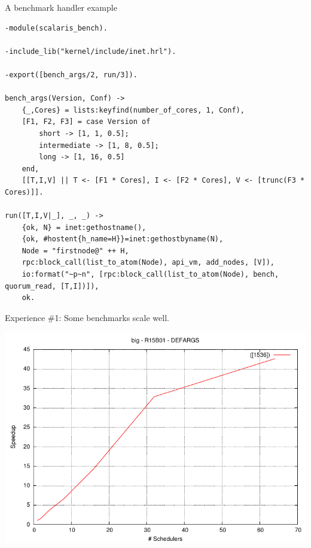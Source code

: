 \documentclass{beamer}
\begin{document}
\begin{frame}[fragile]{A benchmark handler example}

	\tiny
    \begin{verbatim}
-module(scalaris_bench).

-include_lib("kernel/include/inet.hrl").

-export([bench_args/2, run/3]).

bench_args(Version, Conf) ->
    {_,Cores} = lists:keyfind(number_of_cores, 1, Conf),
	[F1, F2, F3] = case Version of
		short -> [1, 1, 0.5];
		intermediate -> [1, 8, 0.5];
		long -> [1, 16, 0.5]
	end,
	[[T,I,V] || T <- [F1 * Cores], I <- [F2 * Cores], V <- [trunc(F3 * Cores)]].

run([T,I,V|_], _, _) ->
	{ok, N} = inet:gethostname(),
	{ok, #hostent{h_name=H}}=inet:gethostbyname(N),
	Node = "firstnode@" ++ H,
	rpc:block_call(list_to_atom(Node), api_vm, add_nodes, [V]),
	io:format("~p~n", [rpc:block_call(list_to_atom(Node), bench, quorum_read, [T,I])]),
	ok.
	\end{verbatim}
	\normalsize
\end{frame}

\begin{frame}{Experience \#1: Some benchmarks scale well.}
	\begin{center}
		\includegraphics[width=0.8\linewidth]{figures/big-speedup-bulldozer.pdf}
	\end{center}
\end{frame}
\end{document}
